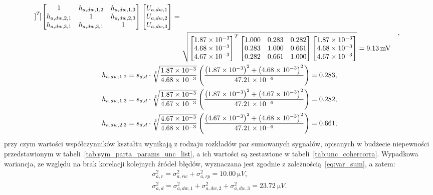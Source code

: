 \begin{gather}
\begin{split}
{\begin{bmatrix}
\end{bmatrix}^{T}
\begin{bmatrix}
1            & h_{a,dw,1,2} & h_{a,dw,1,3} \\
h_{a,dw,2,1} & 1            & h_{a,dw,2,3} \\
h_{a,dw,3,1} & h_{a,dw,3,1} & 1                 \\
\end{bmatrix}
\begin{bmatrix}
U_{a,dw,1} \\ U_{a,dw,2} \\ U_{a,dw,3}
\end{bmatrix}} =~\\
& \sqrt{
\begin{bmatrix}
\num{1.87e-3} \\ \num{4.68e-3} \\ \num{4.67e-3}
\end{bmatrix}^{T}
\begin{bmatrix}
1.000 & 0.283 & 0.282 \\
0.283 & 1.000 & 0.661 \\
0.282 & 0.661 & 1.000 \\
\end{bmatrix}
\begin{bmatrix}
\num{1.87e-3} \\ \num{4.68e-3} \\ \num{4.67e-3}
\end{bmatrix}} = \qty{9.13}{mV}
\end{split}
\label{eq:sym_parta_uncert_dyn}, \\
h_{a,dw,1,2} = s_{d,d} \cdot \sqrt[3]{\frac{\num{1.87e-3}}{\num{4.68e-3}}} \left( \frac{\left(\num{1.87e-3}\right)^{2} + \left(\num{4.68e-3}\right)^{2}}{\num{47.21e-6}} \right) = 0.283 \label{eq:sym_parta_coher_dw_1_2}, \\
h_{a,dw,1,3} = s_{d,d} \cdot \sqrt[3]{\frac{\num{1.87e-3}}{\num{4.67e-3}}} \left( \frac{\left(\num{1.87e-3}\right)^{2} + \left(\num{4.67e-3}\right)^{2}}{\num{47.21e-6}} \right) = 0.282 \label{eq:sym_parta_coher_dw_1_3}, \\
h_{a,dw,2,3} = s_{d,d} \cdot \sqrt[3]{\frac{\num{4.67e-3}}{\num{4.68e-3}}} \left( \frac{\left(\num{4.67e-3}\right)^{2} + \left(\num{4.68e-3}\right)^{2}}{\num{47.21e-6}} \right) = 0.661 \label{eq:sym_parta_coher_dw_2_3},
\end{gather}
przy czym wartości współczynników kształtu wynikają z rodzaju rozkładów par sumowanych sygnałów, opisanych w budżecie niepewności przedstawionym w tabeli~\ref{tab:sym_parta_params_unc_list}, a ich wartości są zestawione w tabeli~\ref{tab:unc_cohercorra}. Wypadkowa wariancja, ze względu na brak korelacji kolejnych źródeł błędów, wyznaczana jest zgodnie z zależnością~\eqref{eq:var_sum}, a zatem:
\begin{gather}
\sigma_{a,r}^{2} = \sigma_{a,rw}^{2} + \sigma_{a,rp}^{2} = \qty{10.00}{\micro V} \label{eq:sym_parta_var_rand}, \\
\sigma_{a,d}^{2} = \sigma_{a,dw,1}^{2} + \sigma_{a,dw,2}^{2} + \sigma_{a,dw,3}^{2} = \qty{23.72}{\micro V} \label{eq:sym_parta_var_dyn}.
\end{gather}

